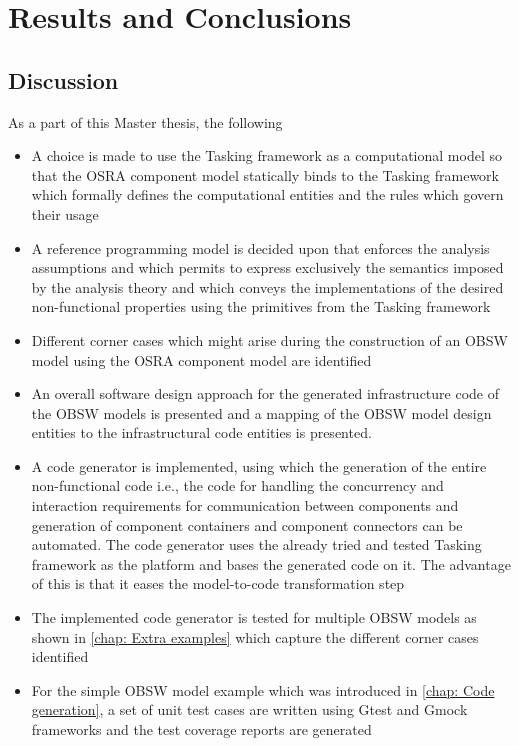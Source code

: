 
\chapter{Results and Conclusions}
\label{chap:conclusion}

\section{Discussion}
As a part of this Master thesis, the following 
\begin{itemize}
\item A choice is made to use the Tasking framework as a computational model so that the OSRA component model statically binds to the Tasking framework which formally defines the computational entities and the rules which govern their usage 
\item A reference programming model is decided upon that enforces the analysis assumptions and which permits to express exclusively the semantics imposed by the analysis theory and which conveys the implementations of the desired non-functional properties using the primitives from the Tasking framework
\item Different corner cases which might arise during the construction of an OBSW model using the OSRA component model are identified 
\item An overall software design approach for the generated infrastructure code of the OBSW models is presented and a mapping of the OBSW model design entities to the infrastructural code entities is presented.  
\item A code generator is implemented, using which the generation of the entire non-functional code i.e., the code for handling the concurrency and interaction requirements for communication between components and generation of component containers and component connectors can be automated. The code generator uses the already tried and tested Tasking framework as the platform and bases the generated code on it. The advantage of this is that it eases the model-to-code transformation step 
\item The implemented code generator is tested for multiple OBSW models as shown in \cref{chap: Extra examples} which capture the different corner cases identified
\item For the simple OBSW model example which was introduced in \cref{chap: Code generation}, a set of unit test cases are written using Gtest and Gmock frameworks and the test coverage reports are generated
\end{itemize}

